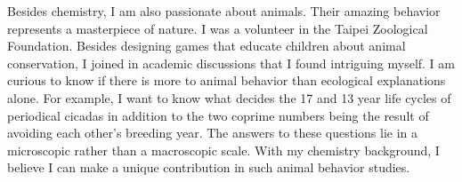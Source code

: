 \documentclass[a4paper, 12pt]{article}
\begin{document}
\vspace*{-1.2ex} 
Besides chemistry, I am also passionate about animals. Their amazing behavior represents a masterpiece of nature. I was a volunteer in the Taipei Zoological Foundation. Besides designing games that educate children about animal conservation, I joined in academic discussions that I found intriguing myself. I am curious to know if there is more to animal behavior than ecological explanations alone.  For example, I want to know what decides the 17 and 13 year life cycles of periodical cicadas in addition to the two coprime numbers being the result of avoiding each other's breeding year. The answers to these questions lie in a microscopic rather than a macroscopic scale. With my chemistry background, I believe I can make a unique contribution in such animal behavior studies.\\
\end{document}
